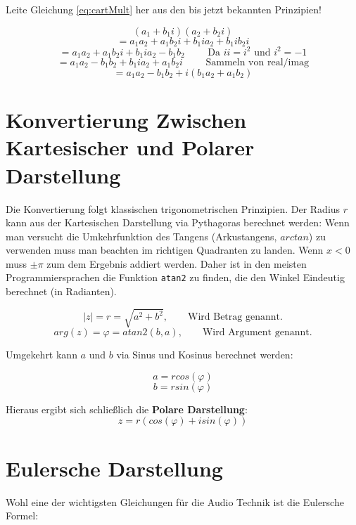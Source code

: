 \begin{question}
    Leite Gleichung \ref{eq:cartMult} her aus den bis jetzt bekannten Prinzipien! 
\end{question}

\begin{answer}
$$(a_1 + b_1i) (a_2 + b_2i)$$
$$ = a_1a_2 + a_1b_2i + b_1i a_2 +b_1i b_2i$$
$$ = a_1a_2 +  a_1b_2i +b_1i a_2 - b_1 b_2 \qquad\text{ Da } ii = i^2 \text{ und } i^2=-1$$
$$ = a_1a_2 - b_1 b_2 + b_1i a_2 + a_1b_2i  \qquad\text{ Sammeln von real/imag}$$
$$ = a_1a_2 - b_1 b_2 +  i (b_1 a_2 + a_1b_2)$$
\end{answer}


\section{Konvertierung Zwischen Kartesischer und Polarer Darstellung}
Die Konvertierung folgt klassischen trigonometrischen Prinzipien.
Der Radius $r$ kann aus der Kartesischen Darstellung via Pythagoras berechnet werden:
Wenn man versucht die Umkehrfunktion des Tangens (Arkustangens, $arctan$) zu verwenden muss man beachten im richtigen Quadranten zu landen. Wenn $x<0$ muss $\pm \pi$ zum dem Ergebnis addiert werden. Daher ist in den meisten Programmiersprachen die Funktion \texttt{atan2} zu finden, die den Winkel Eindeutig berechnet (in Radianten). 

$$|z| = r = \sqrt{a^2 + b^2}, \qquad \text{Wird Betrag genannt.}$$
$$ arg(z) = \varphi = atan2(b,a), \qquad \text{Wird Argument genannt.} $$



Umgekehrt kann $a$ und $b$ via Sinus und Kosinus berechnet werden:

$$a = r cos(\varphi)$$
$$b = r sin(\varphi)$$

Hieraus ergibt sich schließlich die \textbf{Polare Darstellung}:
$$ z = r (cos(\varphi) + i sin(\varphi))$$




\section{Eulersche Darstellung}\label{sec:eulersche_darstellung}


Wohl eine der wichtigsten Gleichungen für die Audio Technik ist die Eulersche Formel:

